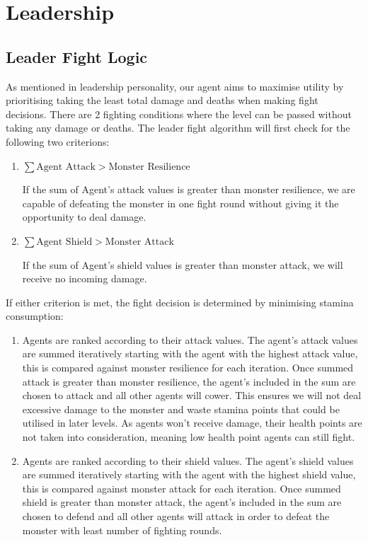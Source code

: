 \section{Leadership}

\subsection{Leader Fight Logic}
As mentioned in leadership personality, our agent aims to maximise utility by prioritising taking the least total damage and deaths when making fight decisions. There are 2 fighting conditions where the level can be passed without taking any damage or deaths. The leader fight algorithm will first check for the following two criterions:

\begin{enumerate}
    \item
          $\sum{\text{Agent Attack}} > \text{Monster Resilience}$

          If the sum of Agent's attack values is greater than monster resilience, we are capable of defeating the monster in one fight round without giving it the opportunity to deal damage.

    \item
          $\sum{\text{Agent Shield}} > \text{Monster Attack}$

          If the sum of Agent's shield values is greater than monster attack, we will receive no incoming damage.
\end{enumerate}

If either criterion is met, the fight decision is determined by minimising stamina consumption:

\begin{enumerate}
    \item  Agents are ranked according to their attack values. The agent's attack values are summed iteratively starting with the agent with the highest attack value, this is compared against monster resilience for each iteration. Once summed attack is greater than monster resilience, the agent's included in the sum are chosen to attack and all other agents will cower. This ensures we will not deal excessive damage to the monster and waste stamina points that could be utilised in later levels. As agents won't receive damage, their health points are not taken into consideration, meaning low health point agents can still fight.
    \item  Agents are ranked according to their shield values. The agent's shield values are summed iteratively starting with the agent with the highest shield value, this is compared against monster attack for each iteration. Once summed shield is greater than monster attack, the agent's included in the sum are chosen to defend and all other agents will attack in order to defeat the monster with least number of fighting rounds.
\end{enumerate}

